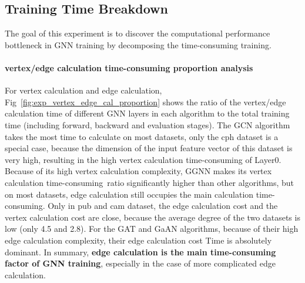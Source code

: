 \subsection{Training Time Breakdown}
\label{sec:training_time_breakdown}

The goal of this experiment is to discover the computational performance bottleneck in GNN training
by decomposing the time-consuming training.

\paragraph{vertex/edge calculation time-consuming proportion analysis}

For vertex calculation and edge calculation, Fig~\ref{fig:exp_vertex_edge_cal_proportion} shows the ratio of the vertex/edge calculation time of different GNN layers in each algorithm
to the total training time (including forward, backward and evaluation stages). The GCN algorithm takes the most time to calculate on most datasets, 
only the cph dataset is a special case, because the dimension of the input feature vector of this dataset is very high, resulting in the 
high vertex calculation time-consuming of Layer0. Because of its high vertex calculation complexity, GGNN makes its vertex calculation time-consuming\
ratio significantly higher than other algorithms, but on most datasets, edge calculation still occupies the main calculation time-consuming. 
Only in pub and cam dataset, the edge calculation cost and the vertex calculation cost are close, because the average degree of the two datasets is low (only 4.5 and 2.8).
For the GAT and GaAN algorithms, because of their high edge calculation complexity, their edge calculation cost Time is absolutely dominant. 
In summary, \textbf{edge calculation is the main time-consuming factor of GNN training}, especially in the case of more complicated edge calculation.

